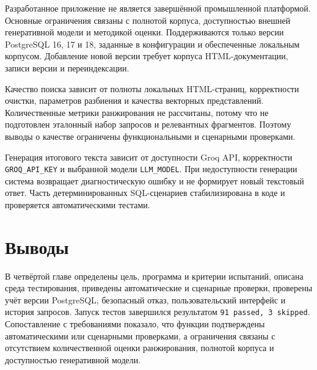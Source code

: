 Разработанное приложение не является завершённой промышленной платформой. Основные ограничения связаны с полнотой корпуса, доступностью внешней генеративной модели и методикой оценки. Поддерживаются только версии PostgreSQL 16, 17 и 18, заданные в конфигурации и обеспеченные локальным корпусом. Добавление новой версии требует корпуса HTML-документации, записи версии и переиндексации.

Качество поиска зависит от полноты локальных HTML-страниц, корректности очистки, параметров разбиения и качества векторных представлений. Количественные метрики ранжирования не рассчитаны, потому что не подготовлен эталонный набор запросов и релевантных фрагментов. Поэтому выводы о качестве ограничены функциональными и сценарными проверками.

Генерация итогового текста зависит от доступности Groq API, корректности \texttt{GROQ\_API\_KEY} и выбранной модели \texttt{LLM\_MODEL}. При недоступности генерации система возвращает диагностическую ошибку и не формирует новый текстовый ответ. Часть детерминированных SQL-сценариев стабилизирована в коде и проверяется автоматическими тестами.

\section{Выводы}

В четвёртой главе определены цель, программа и критерии испытаний, описана среда тестирования, приведены автоматические и сценарные проверки, проверены учёт версии PostgreSQL, безопасный отказ, пользовательский интерфейс и история запросов. Запуск тестов завершился результатом \texttt{91 passed, 3 skipped}. Сопоставление с требованиями показало, что функции подтверждены автоматическими или сценарными проверками, а ограничения связаны с отсутствием количественной оценки ранжирования, полнотой корпуса и доступностью генеративной модели.
